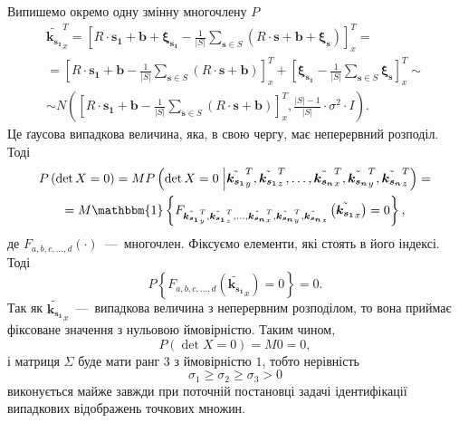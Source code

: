 Випишемо окремо одну змінну многочлену $P$
\begin{equation}\label{eq:normal}
  \begin{gathered}
    \tilde{\boldsymbol{k_{s_1}}}_x^T =
    \left[
      R \cdot \boldsymbol{s_1} + \boldsymbol{b} + \boldsymbol{ \xi_{s_1} } -
      \frac{1}{ \left| S \right| } \sum \limits_{\boldsymbol{s} \in S}
        \left( R \cdot \boldsymbol{s} + \boldsymbol{b} + \boldsymbol{ \xi_s } \right) \right]_x^T = \\
    = \left[
      R \cdot \boldsymbol{s_1} + \boldsymbol{b} - \frac{1}{ \left| S \right| } \sum \limits_{\boldsymbol{s} \in S}
        \left( R \cdot \boldsymbol{s} + \boldsymbol{b} \right) \right]_x^T +
    \left[
      \boldsymbol{ \xi_{s_1} } -
      \frac{1}{ \left| S \right| } \sum \limits_{\boldsymbol{s} \in S} \boldsymbol{ \xi_{s} } \right]_x^T \sim \\
    \sim N \left(
      \left[ R \cdot \boldsymbol{s_1} + \boldsymbol{b} -
      \frac{1}{ \left| S \right| } \sum \limits_{\boldsymbol{s} \in S} \left(
        R \cdot \boldsymbol{s} + \boldsymbol{b}
      \right) \right]_x^T,
      \frac{ \left| S \right| - 1}{ \left| S \right| } \cdot \sigma^2 \cdot I
    \right).
  \end{gathered}
\end{equation}
Це ґаусова випадкова величина, яка, в свою чергу, має неперервний розподіл.
Тоді
\begin{equation*}
  \begin{gathered}
    P \left( \det{X} = 0 \right) =
    M P \left(
      \det{X} = 0 \; \middle|
      \tilde{\boldsymbol{k_{s_1}}}_y^T, \tilde{\boldsymbol{k_{s_1}}}_z^T, \dotsc,
      \tilde{\boldsymbol{k_{s_n}}}_x^T, \tilde{\boldsymbol{k_{s_n}}}_y^T, \tilde{\boldsymbol{k_{s_n}}}_z^T
    \right) = \\
    = M \mathbbm{1} \left\{
      F_{ \tilde{\boldsymbol{k_{s_1}}}_y^T, \tilde{\boldsymbol{k_{s_1}}}_z^T, \dotsc, \tilde{\boldsymbol{k_{s_n}}}_x^T, \tilde{\boldsymbol{k_{s_n}}}_y^T, \tilde{\boldsymbol{k_{s_n}}}_z}
      \left( \tilde{\boldsymbol{k_{s_1}}}_x \right) = 0
    \right\},
  \end{gathered}
\end{equation*}
де $F_{a, b, c, \dotsc, d} \left( \cdot \right) $~---~многочлен.
Фіксуємо елементи, які стоять в його індексі.
Тоді
\begin{equation*}
  P \left\{ F_{a, b, c, \dotsc, d} \left( \tilde{\boldsymbol{k_{s_1}}}_x \right) = 0 \right\} = 0.
\end{equation*}
Так як $\tilde{\boldsymbol{k_{s_1}}}_x$~---~випадкова величина з неперервним розподілом,
то вона приймає фіксоване значення з нульовою ймовірністю.
Таким чином,
\begin{equation*}
  P \left( \det{X} = 0 \right) = M 0 = 0,
\end{equation*}
і матриця $ \Sigma $ буде мати ранг 3 з ймовірністю $1$, тобто нерівність
\begin{equation*}
  \sigma_1 \geq
  \sigma_2 \geq
  \sigma_3 >
  0
\end{equation*}
виконується майже завжди при поточній постановці задачі ідентифікації випадкових
відображень точкових множин.

